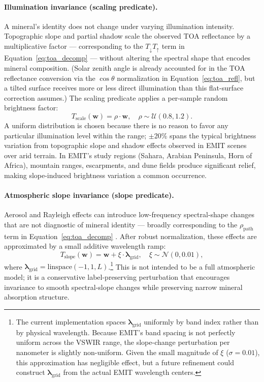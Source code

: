 \documentclass[11pt]{report}
\begin{document}
\paragraph{Illumination invariance (scaling predicate).}
A mineral’s identity does not change under varying illumination intensity. Topographic slope and partial shadow scale the observed TOA reflectance by a multiplicative factor --- corresponding to the $T_{\downarrow} T_{\uparrow}$ term in Equation~\ref{eq:toa_decomp} --- without altering the spectral shape that encodes mineral composition. (Solar zenith angle is already accounted for in the TOA reflectance conversion via the $\cos\theta$ normalization in Equation~\ref{eq:toa_refl}, but a tilted surface receives more or less direct illumination than this flat-surface correction assumes.) The scaling predicate applies a per-sample random brightness factor:
\begin{equation}
T_{\text{scale}}(\mathbf{w}) = \rho \cdot \mathbf{w}, \quad \rho \sim \mathcal{U}(0.8, 1.2).
\label{eq:scale_predicate}
\end{equation}
A uniform distribution is chosen because there is no reason to favor any particular illumination level within the range; $\pm$20\% spans the typical brightness variation from topographic slope and shadow effects observed in EMIT scenes over arid terrain. In EMIT's study regions (Sahara, Arabian Peninsula, Horn of Africa), mountain ranges, escarpments, and dune fields produce significant relief, making slope-induced brightness variation a common occurrence.

\paragraph{Atmospheric slope invariance (slope predicate).}
Aerosol and Rayleigh effects can introduce low-frequency spectral-shape changes that are not diagnostic of mineral identity --- broadly corresponding to the $\rho_{\text{path}}$ term in Equation~\ref{eq:toa_decomp} \cite{richter_atcor_atbd}. After robust normalization, these effects are approximated by a small additive wavelength ramp:
\begin{equation}
T_{\text{slope}}(\mathbf{w}) = \mathbf{w} + \xi \cdot \boldsymbol{\lambda}_{\text{grid}}, \quad \xi \sim \mathcal{N}(0, 0.01),
\label{eq:slope_predicate}
\end{equation}
where $\boldsymbol{\lambda}_{\text{grid}} = \mathrm{linspace}(-1, 1, L)$.\footnote{The current implementation spaces $\boldsymbol{\lambda}_{\text{grid}}$ uniformly by band index rather than by physical wavelength. Because EMIT's band spacing is not perfectly uniform across the VSWIR range, the slope-change perturbation per nanometer is slightly non-uniform. Given the small magnitude of $\xi$ ($\sigma = 0.01$), this approximation has negligible effect, but a future refinement could construct $\boldsymbol{\lambda}_{\text{grid}}$ from the actual EMIT wavelength centers.} This is not intended to be a full atmospheric model; it is a conservative label-preserving perturbation that encourages invariance to smooth spectral-slope changes while preserving narrow mineral absorption structure.
\end{document}
